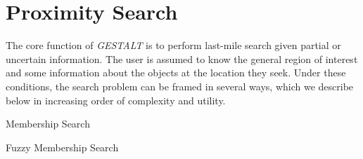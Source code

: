 \section{Proximity Search}
\label{section:prox_search}

The core function of \textit{GESTALT} is to perform last-mile search given partial or uncertain information.
The user is assumed to know the general region of interest and some information about the objects at the location they seek.
Under these conditions, the search problem can be framed in several ways, which we describe below in increasing order of complexity and utility.

\begin{algorithm}
    \caption{Membership Search}\label{alg:search}
    \begin{algorithmic}
        \State{- - - - -}
            \EndFor
            \EndProcedure
    \end{algorithmic}
\end{algorithm}

\begin{algorithm}
    \caption{Fuzzy Membership Search}\label{alg:fuzzySearch}
    \begin{algorithmic}[2]
        \State{- - - - -}
                \Else
                \EndIf
            \EndIf
            \EndIf
        \EndProcedure
    \end{algorithmic}
\end{algorithm}


